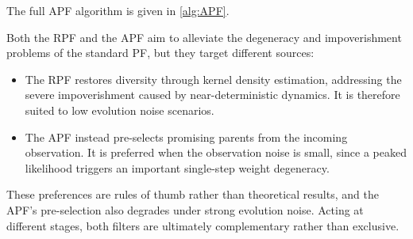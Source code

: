 The full APF algorithm is given in \cref{alg:APF}.

\begin{algorithm}[H]
	\begin{algorithmic}
	\end{algorithmic}\caption{Auxiliary Particle Filter}\label{alg:APF}
\end{algorithm}

\begin{remark}
	Both the RPF and the APF aim to alleviate the degeneracy and impoverishment problems of the standard PF, but they target different sources:
	\begin{itemize}
		\item The RPF restores diversity through kernel density estimation, addressing the severe impoverishment caused by near-deterministic dynamics. It is therefore suited to low evolution noise scenarios.
		\item The APF instead pre-selects promising parents from the incoming observation. It is preferred when the observation noise is small, since a peaked likelihood triggers an important single-step weight degeneracy.
	\end{itemize}

	These preferences are rules of thumb rather than theoretical results, and the APF's pre-selection also degrades under strong evolution noise. Acting at different stages, both filters are ultimately complementary rather than exclusive.
\end{remark}

